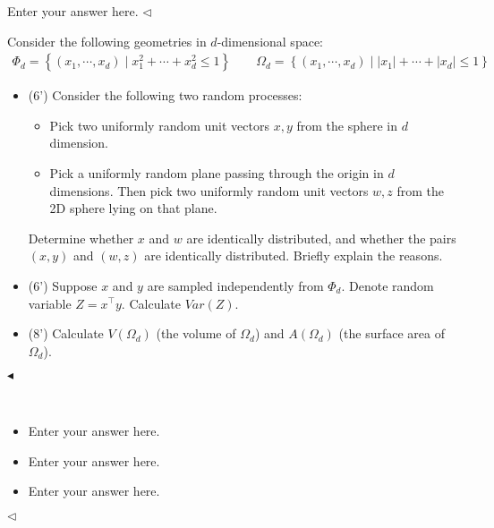 \documentclass[11pt]{article}
\newenvironment{problem}[2][Problem]{\begin{trivlist}
\item[\hskip \labelsep {\bfseries #1}\hskip \labelsep {\bfseries #2.}]}{\hfill$\blacktriangleleft$\end{trivlist}}
\newenvironment{answer}[1][Answer]{\begin{trivlist}
\item[\hskip \labelsep {\bfseries #1.}\hskip \labelsep]}{\hfill$\lhd$\end{trivlist}}
\begin{document}
\begin{answer}
Enter your answer here.
\end{answer}



\begin{problem}{8 (20')} 
Consider the following geometries in $d$-dimensional space:
\begin{align*}
    \Phi_d=\left\{(x_1,\cdots,x_d)\mid x_1^2+\cdots+x_d^2\leq 1\right\}\qquad
    \Omega_d=\left\{(x_1,\cdots,x_d)\mid |x_1|+\cdots+|x_d|\leq 1\right\}
\end{align*}
\begin{itemize}
    \item [(1)] (6') Consider the following two random processes:
    \begin{itemize}
        \item Pick two uniformly random unit vectors $x,y$ from the sphere in $d$ dimension.
        \item Pick a uniformly random plane passing through the origin in $d$ dimensions. Then pick two uniformly random unit vectors $w,z$ from the 2D sphere lying on that plane.
    \end{itemize}
    Determine whether $x$ and $w$ are identically distributed, and whether the pairs $(x,y)$ and $(w,z)$ are identically distributed. Briefly explain the reasons.
    \item [(2)] (6') Suppose $x$ and $y$ are sampled independently from $\Phi_d$. Denote random variable $Z=x^\top y$. Calculate $Var(Z)$.
    \item [(3)] (8') Calculate $V(\Omega_d)$ (the volume of $\Omega_d$) and $A(\Omega_d)$ (the surface area of $\Omega_d$).
\end{itemize}
\end{problem}

\begin{answer} ~
\begin{itemize}
    \item [(1)] Enter your answer here.
    \item [(2)] Enter your answer here.
    \item [(3)] Enter your answer here. 
\end{itemize}
\end{answer}
\end{document}
